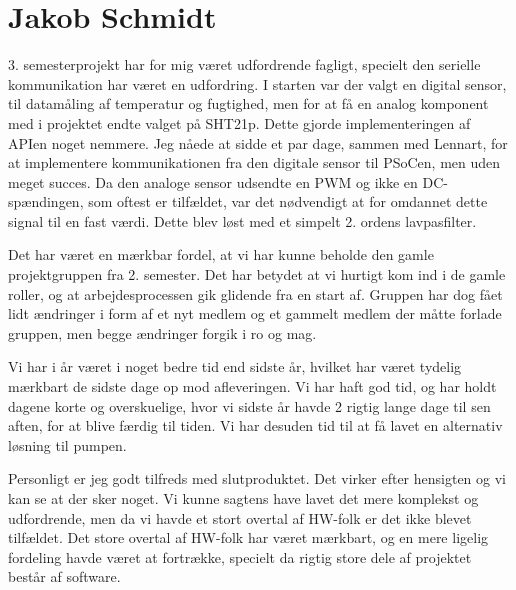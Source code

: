 \section{Jakob Schmidt}

3. semesterprojekt har for mig været udfordrende fagligt, specielt den serielle kommunikation har været en udfordring. I starten var der valgt en digital sensor, til datamåling af temperatur og fugtighed, men for at få en analog komponent med i projektet endte valget på SHT21p. Dette gjorde implementeringen af APIen noget nemmere. Jeg nåede at sidde et par dage, sammen med Lennart, for at implementere kommunikationen fra den digitale sensor til PSoCen, men uden meget succes. 
Da den analoge sensor udsendte en PWM og ikke en DC-spændingen, som oftest er tilfældet, var det nødvendigt at for omdannet dette signal til en fast værdi. Dette blev løst med et simpelt 2. ordens lavpasfilter. 

Det har været en mærkbar fordel, at vi har kunne beholde den gamle projektgruppen fra 2. semester. Det har betydet at vi hurtigt kom ind i de gamle roller, og at arbejdesprocessen gik glidende fra en start af. Gruppen har dog fået lidt ændringer i form af et nyt medlem og et gammelt medlem der måtte forlade gruppen, men begge ændringer forgik i ro og mag.

Vi har i år været i noget bedre tid end sidste år, hvilket har været tydelig mærkbart de sidste dage op mod afleveringen. Vi har haft god tid, og har holdt dagene korte og overskuelige, hvor vi sidste år havde 2 rigtig lange dage til sen aften, for at blive færdig til tiden. 
Vi har desuden tid til at få lavet en alternativ løsning til pumpen.

Personligt er jeg godt tilfreds med slutproduktet. Det virker efter hensigten og vi kan se at der sker noget. Vi kunne sagtens have lavet det mere komplekst og udfordrende, men da vi havde et stort overtal af HW-folk er det ikke blevet tilfældet. Det store overtal af HW-folk har været mærkbart, og en mere ligelig fordeling havde været at fortrække, specielt da rigtig store dele af projektet består af software. 


